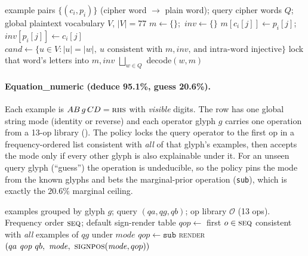 \documentclass[11pt]{article}
\begin{document}
\begin{algorithm}[htbp]
\caption{\textsc{Cipher}, monoalphabetic substitution over a closed 77-word vocabulary (100\%)}
\label{alg:cipher}
\begin{algorithmic}[1]
\Require example pairs $\{(c_i,p_i)\}$ (cipher word $\to$ plain word); query cipher words $Q$;
  global plaintext vocabulary $V$, $|V|=77$
\State $m \gets \{\}$;\ $\mathit{inv}\gets\{\}$ 
 
   $m[c_i[j]]\gets p_i[j]$;\ $\mathit{inv}[p_i[j]]\gets c_i[j]$ \EndFor
\EndFor
\Repeat {}
    \State $\mathit{cand}\gets\{u\in V : |u|=|w|,\ u \text{ consistent with } m,\mathit{inv}\text{, and intra-word injective}\}$
     lock that word's letters into $m,\mathit{inv}$ \EndIf
  \EndFor
{}
\State \Return $\textstyle\bigsqcup_{w\in Q}$ decode$(w,m)$ 
\end{algorithmic}
\end{algorithm}

\paragraph{Equation\_numeric (deduce 95.1\%, guess 20.6\%).} Each example is
$AB\,g\,CD=\textsc{rhs}$ with \emph{visible} digits. The row has one global string mode
(identity or reverse) and each operator glyph $g$ carries one operation from a 13-op library
(). The policy locks the query operator to the first op in a
frequency-ordered list consistent with \emph{all} of that glyph's examples, then accepts the
mode only if every other glyph is also explainable under it. For an unseen query glyph
(``guess'') the operation is undeducible, so the policy pins the mode from the known glyphs
and bets the marginal-prior operation (\texttt{sub}), which is exactly the $20.6\%$ marginal
ceiling.

\begin{algorithm}[htbp]
\caption{\textsc{Equation\_numeric}, \texttt{policy\_seq} (deduce 95.1\%, guess 20.6\%)}
\label{alg:eq}
\begin{algorithmic}[1]
\Require examples grouped by glyph $g$; query $(qa,qg,qb)$;
  op library $\mathcal{O}$ (13 ops). Frequency order $\textsc{seq}$; default sign-render table
 
  \State $\mathit{qop}\gets$ first $o\in\textsc{seq}$ consistent with \emph{all} examples of $qg$ under $\mathit{mode}$
   $\mathit{qop}\gets\texttt{sub}$ \EndIf {}
   
    \State \Return \textsc{render}$(qa\ \mathit{qop}\ qb,\ \mathit{mode},\ \textsc{signpos}(\mathit{mode},qop))$
  \EndIf
\EndFor
\end{algorithmic}
\end{algorithm}
\end{document}
